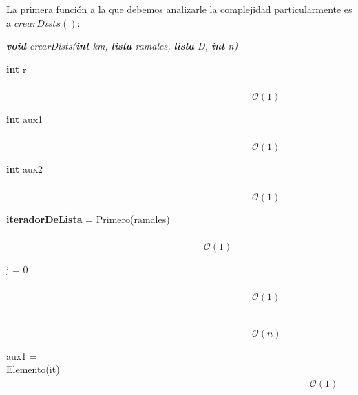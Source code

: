 \documentclass[spanish,a4paper]{article}
\begin{document}
La primera función a la que debemos analizarle la complejidad particularmente es a $crearDists()$:

\begin{algorithm}[H]

\noindent \textit{ \textbf{void} crearDists(\textbf{int} km, \textbf{lista} ramales, \textbf{lista} D, \textbf{int} n)}
\begin{algorithmic}

    \STATE
    
    \STATE \textbf{int} r \ \ \ \ \ \ \ \ \ \ \ \ \ \ \ \ \ \ \ \ \ \ \ \ \ \ \ \ \ \ \ \ \ \ \ \ \ \ \ \ \ \ \ \ \ \ \ \ \ \ \ \ \ \ \ \ \ \ \ \ \ \ \ \ \ \ \ \ \ \ \ \ \ \ \ \ \ \ \ \ \ \ \ \ \ \ \ \ \ \ \ \ \ \ \ \ \ \ \ \ \ \ \ \ \ \ \ \ \ \ \ \ \ \ \ \ \ \ \ \ \ \ \ $\mathcal{O}(1)$
    
    \STATE \textbf{int} aux1 \ \ \ \ \ \ \ \ \ \ \ \ \ \ \ \ \ \ \ \ \ \ \ \ \ \ \ \ \ \ \ \ \ \ \ \ \ \ \ \ \ \ \ \ \ \ \ \ \ \ \ \ \ \ \ \ \ \ \ \ \ \ \ \ \ \ \ \ \ \ \ \ \ \ \ \ \ \ \ \ \ \ \ \ \ \ \ \ \ \ \ \ \ \ \ \ \ \ \ \ \ \ \ \ \ \ \ \ \ \ \ \ \ \ \ \ \ \ \ \ \ \ \ $\mathcal{O}(1)$
    
    \STATE \textbf{int} aux2 \ \ \ \ \ \ \ \ \ \ \ \ \ \ \ \ \ \ \ \ \ \ \ \ \ \ \ \ \ \ \ \ \ \ \ \ \ \ \ \ \ \ \ \ \ \ \ \ \ \ \ \ \ \ \ \ \ \ \ \ \ \ \ \ \ \ \ \ \ \ \ \ \ \ \ \ \ \ \ \ \ \ \ \ \ \ \ \ \ \ \ \ \ \ \ \ \ \ \ \ \ \ \ \ \ \ \ \ \ \ \ \ \ \ \ \ \ \ \ \ \ \ \ $\mathcal{O}(1)$
    
    \STATE \textbf{iteradorDeLista} = Primero(ramales) \ \ \ \ \ \ \ \ \ \ \ \ \ \ \ \ \ \ \ \ \ \ \ \ \ \ \ \ \ \ \ \ \ \ \ \ \ \ \ \ \ \ \ \ \ \ \ \ \ \ \ \ \ \ \ \ \ \ \ \ \ \ \ \ \ \ \ \ \ \ \ \ \ \ \ \ \ \ \ \ \ \ \ \ \ \ \ \ \ \ \ \ \ \ \ \ \ \ \ \ \ \ \ \ \ \ \ \ \ \ \ \ \ $\mathcal{O}(1)$
    
     j = 0 \ \ \ \ \ \ \ \ \ \ \ \ \ \ \ \ \ \ \ \ \ \ \ \ \ \ \ \ \ \ \ \ \ \ \ \ \ \ \ \ \ \ \ \ \ \ \ \ \ \ \ \ \ \ \ \ \ \ \ \ \ \ \ \ \ \ \ \ \ \ \ \ \ \ \ \ \ \ \ \ \ \ \ \ \ \ \ \ \ \ \ \ \ \ \ \ \ \ \ \ \ \ \ \ \ \ \ \ \ \ \ \ \ \ \ \ \ \ \ \ \ \ \ $\mathcal{O}(1)$
    
    \STATE \ \ \ \ \ \ \ \ \ \ \ \ \ \ \ \ \ \ \ \ \ \ \ \ \ \ \ \ \ \ \ \ \ \ \ \ \ \ \ \ \ \ \ \ \ \ \ \ \ \ \ \ \ \ \ \ \ \ \ \ \ \ \ \ \ \ \ \ \ \ \ \ \ \ \ \ \ \ \ \ \ \ \ \ \ \ \ \ \ \ \ \ \ \ \ \ \ \ \ \ \ \ \ \ \ \ \ \ \ \ \ \ \ \ \ \ \ \ \ \ \ \ \ $\mathcal{O}(n)$
    
    \STATE aux1 = Elemento(it)\ \ \ \ \ \ \ \ \ \ \ \ \ \ \ \ \ \ \ \ \ \ \ \ \ \ \ \ \ \ \ \ \ \ \ \ \ \ \ \ \ \ \ \ \ \ \ \ \ \ \ \ \ \ \ \ \ \ \ \ \ \ \ \ \ \ \ \ \ \ \ \ \ \ \ \ \ \ \ \ \ \ \ \ \ \ \ \ \ \ \ \ \ \ \ \ \ \ \ \ \ \ \ \ \ \ \ \ \ \ \ \ \ \ \ \ \ \ \ \ \ \ \ $\mathcal{O}(1)$
    

\end{algorithmic}
\end{algorithm}
\end{document}
